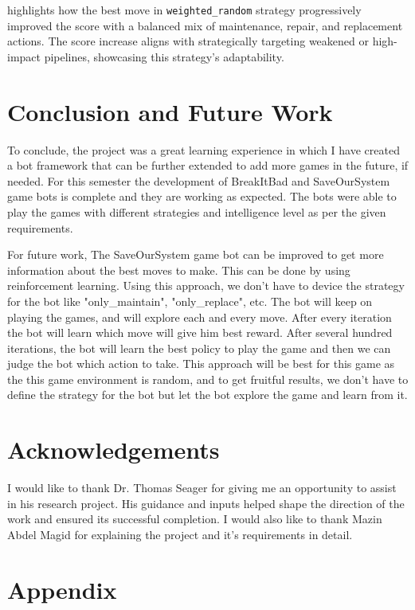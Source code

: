 \documentclass[12pt,a4paper]{article}
\begin{document}
         highlights how the best move in \texttt{weighted\_random} strategy progressively improved the score with a balanced mix of maintenance, repair, and replacement actions. The score increase aligns with strategically targeting weakened or high-impact pipelines, showcasing this strategy’s adaptability.


    \section{Conclusion and Future Work}
    \label{sec:conclusion-future-work}
        To conclude, the project was a great learning experience in which I have created a bot framework that can be further extended to add more games in the future, if needed. For this semester the development of BreakItBad and SaveOurSystem game bots is complete and they are working as expected. The bots were able to play the games with different strategies and intelligence level as per the given requirements.

        For future work, The SaveOurSystem game bot can be improved to get more information about the best moves to make. This can be done by using reinforcement learning. Using this approach, we don't have to device the strategy for the bot like "only\_maintain", "only\_replace", etc. The bot will keep on playing the games, and will explore each and every move. After every iteration the bot will learn which move will give him best reward. After several hundred iterations, the bot will learn the best policy to play the game and then we can judge the bot which action to take. This approach will be best for this game as the this game environment is random, and to get fruitful results, we don't have to define the strategy for the bot but let the bot explore the game and learn from it.

\section{Acknowledgements}
    \label{sec:acknowledgements}
    I would like to thank Dr. Thomas Seager for giving me an opportunity to assist in his research project. His guidance and inputs helped shape the direction of the work and ensured its successful completion. I would also like to thank Mazin Abdel Magid for explaining the project and it's requirements in detail.

    \clearpage
\section*{Appendix}
\appendix
\end{document}
